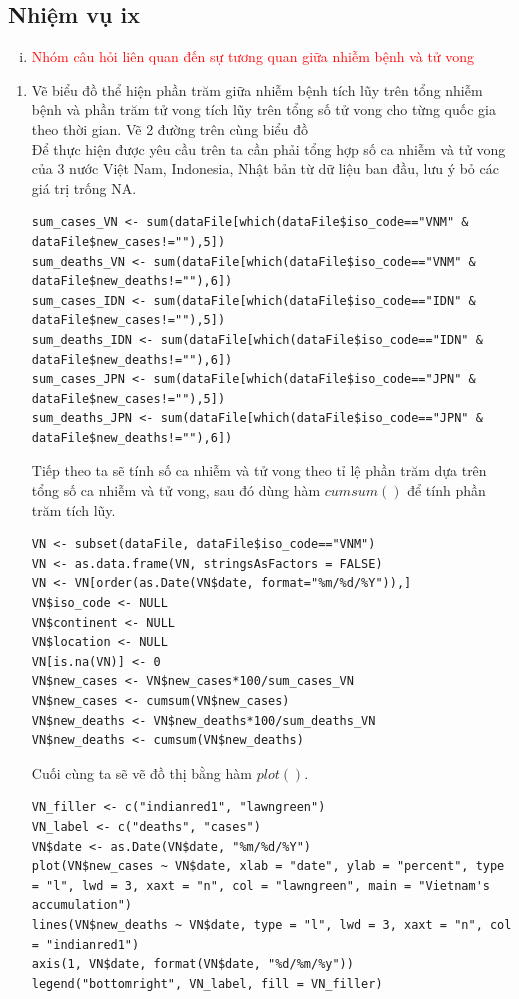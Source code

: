 \documentclass[a4paper]{article}
\theoremstyle{definition}
\begin{document}
\subsection{Nhiệm vụ ix}
\begin{enumerate}[ix)]
\item \textcolor{red}{Nhóm câu hỏi liên quan đến sự tương quan giữa nhiễm bệnh và tử vong}
\end{enumerate}
\begin{enumerate}[1)]
\item Vẽ biểu đồ thể hiện phần trăm giữa nhiễm bệnh tích lũy trên tổng nhiễm bệnh và phần trăm tử vong tích lũy trên tổng số tử vong cho từng quốc gia theo thời gian. Vẽ 2 đường trên cùng biểu đồ\\
Để thực hiện được yêu cầu trên ta cần phải tổng hợp số ca nhiễm và tử vong của 3 nước Việt Nam, Indonesia, Nhật bản từ dữ liệu ban đầu, lưu ý bỏ các giá trị trống NA. 
\begin{lstlisting}
sum_cases_VN <- sum(dataFile[which(dataFile$iso_code=="VNM" & dataFile$new_cases!=""),5])
sum_deaths_VN <- sum(dataFile[which(dataFile$iso_code=="VNM" & dataFile$new_deaths!=""),6])
sum_cases_IDN <- sum(dataFile[which(dataFile$iso_code=="IDN" & dataFile$new_cases!=""),5])
sum_deaths_IDN <- sum(dataFile[which(dataFile$iso_code=="IDN" & dataFile$new_deaths!=""),6])
sum_cases_JPN <- sum(dataFile[which(dataFile$iso_code=="JPN" & dataFile$new_cases!=""),5])
sum_deaths_JPN <- sum(dataFile[which(dataFile$iso_code=="JPN" & dataFile$new_deaths!=""),6])
\end{lstlisting}
Tiếp theo ta sẽ tính số ca nhiễm và tử vong theo tỉ lệ phần trăm dựa trên tổng số ca nhiễm và tử vong, sau đó dùng hàm $cumsum()$ để tính phần trăm tích lũy. 
\begin{lstlisting}
VN <- subset(dataFile, dataFile$iso_code=="VNM")
VN <- as.data.frame(VN, stringsAsFactors = FALSE)
VN <- VN[order(as.Date(VN$date, format="%m/%d/%Y")),]
VN$iso_code <- NULL
VN$continent <- NULL
VN$location <- NULL
VN[is.na(VN)] <- 0
VN$new_cases <- VN$new_cases*100/sum_cases_VN
VN$new_cases <- cumsum(VN$new_cases)
VN$new_deaths <- VN$new_deaths*100/sum_deaths_VN
VN$new_deaths <- cumsum(VN$new_deaths)
\end{lstlisting}
Cuối cùng ta sẽ vẽ đồ thị bằng hàm $plot()$. 
\begin{lstlisting}
VN_filler <- c("indianred1", "lawngreen")
VN_label <- c("deaths", "cases")
VN$date <- as.Date(VN$date, "%m/%d/%Y")
plot(VN$new_cases ~ VN$date, xlab = "date", ylab = "percent", type = "l", lwd = 3, xaxt = "n", col = "lawngreen", main = "Vietnam's accumulation")
lines(VN$new_deaths ~ VN$date, type = "l", lwd = 3, xaxt = "n", col = "indianred1")
axis(1, VN$date, format(VN$date, "%d/%m/%y"))
legend("bottomright", VN_label, fill = VN_filler)
\end{lstlisting}


\end{enumerate}
\end{document}
